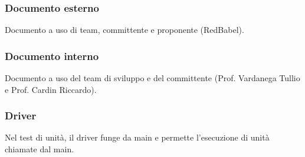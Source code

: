 \subsubsection*{Documento esterno}
Documento a uso di team, committente e proponente (RedBabel).

\subsubsection*{Documento interno}
Documento a uso del team di sviluppo e del committente (Prof. Vardanega Tullio e Prof. Cardin Riccardo).

\subsubsection*{Driver }
Nel test di unità, il driver funge da main e permette l'esecuzione di unità chiamate dal main.

